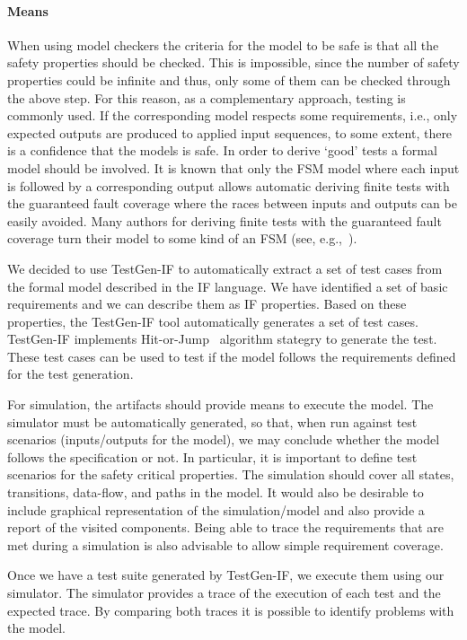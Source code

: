 \paragraph{Means}


When using model checkers the criteria for the model to be safe is that all the
safety properties should be checked. This is impossible, since the number of
safety properties could be infinite and thus, only some of them can be checked
through the above step.
For this reason, as a complementary approach, testing is commonly used. If the
corresponding model respects some requirements, i.e., only expected outputs are
produced to applied input sequences, to some extent, there is a confidence that
the models is safe. In order to derive ‘good’ tests a formal model should be
involved. It is known that only the FSM model where each input is followed by a
corresponding output allows automatic deriving finite tests with the guaranteed
fault coverage where the races between inputs and outputs can be easily avoided.
 Many authors for deriving finite tests with the guaranteed fault coverage turn
their model to some kind of an FSM (see,
e.g.,~\cite{springintveld2001testing,zymc11,Gromov2009}).

We decided to use TestGen-IF to automatically extract a set of test cases from
the formal model described in the IF language. We have identified a set of basic
requirements and we can describe them as IF properties.  Based on these
properties, the TestGen-IF tool automatically generates a set of test cases.
TestGen-IF implements Hit-or-Jump~\cite{Cavallib} algorithm stategry to generate the test.
These test cases can be used to test if the model follows the requirements defined for the test generation.


For simulation, the artifacts should provide means to execute the model.  The
simulator must be automatically generated, so that, when run against test
scenarios (inputs/outputs for the model), we may conclude whether the model
follows the specification or not. In particular, it is important to define test
scenarios for the safety critical properties. The simulation should cover all states,
transitions, data-flow, and paths in the model. It would also be desirable to
include graphical representation of the simulation/model and also provide a
report of the visited components. Being able to trace the
requirements that are met during a simulation is also advisable to allow simple
requirement coverage.

Once we have a test suite generated by TestGen-IF, we execute them using our simulator. The simulator provides a trace of the execution of each test and the expected trace. By comparing both traces it is possible to identify problems with the model.


